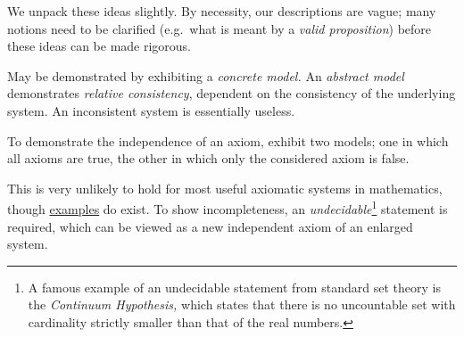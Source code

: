 We unpack these ideas slightly. By necessity, our descriptions are vague; many notions need to be clarified (e.g.\ what is meant by a \emph{valid proposition}) before these ideas can be made rigorous.
\begin{description}\itemsep0pt
	\item[\normalfont\emph{Consistency}] May be demonstrated by exhibiting a \emph{concrete model.} An \emph{abstract model} demonstrates \emph{relative consistency}, dependent on the consistency of the underlying system. An inconsistent system is essentially useless.
	\item[\normalfont\emph{Independence}] To demonstrate the independence of an axiom, exhibit two models; one in which all axioms are true, the other in which only the considered axiom is false. 
	\item[\normalfont\emph{Completeness}] This is very unlikely to hold for most useful axiomatic systems in mathematics, though \href{https://en.wikipedia.org/wiki/Complete_theory}{examples} do exist. To show incompleteness, an \emph{undecidable}\footnote{A famous example of an undecidable statement from standard set theory is the \emph{Continuum Hypothesis,} which states that there is no uncountable set with cardinality strictly smaller than that of the real numbers.} statement is required, which can be viewed as a new independent axiom of an enlarged system. 
	\end{description}


